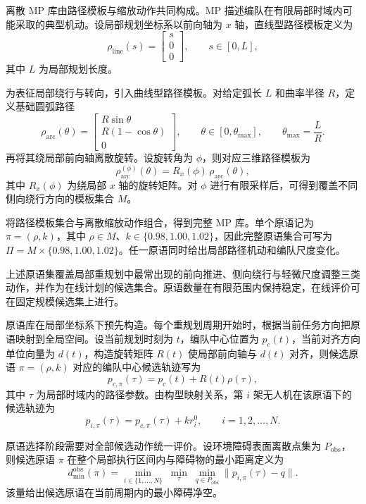 离散 MP 库由路径模板与缩放动作共同构成。MP 描述编队在有限局部时域内可能采取的典型机动。设局部规划坐标系以前向轴为 $x$ 轴，直线型路径模板定义为
\[
\rho_{\mathrm{line}}(s) =
\begin{bmatrix}
s\\0\\0
\end{bmatrix}, \qquad s\in[0,L],
\]
其中 $L$ 为局部规划长度。

为表征局部绕行与转向，引入曲线型路径模板。对给定弧长 $L$ 和曲率半径 $R$，定义基础圆弧路径
\[
\rho_{\mathrm{arc}}(\theta) =
\begin{bmatrix}
R\sin\theta\\
R(1-\cos\theta)\\
0
\end{bmatrix}, \qquad
\theta \in [0,\theta_{\max}], \qquad
\theta_{\max} = \frac{L}{R}.
\]
再将其绕局部前向轴离散旋转。设旋转角为 $\phi$，则对应三维路径模板为
\[
\rho_{\mathrm{arc}}^{(\phi)}(\theta) = R_{x}(\phi) \, \rho_{\mathrm{arc}}(\theta),
\]
其中 $R_{x}(\phi)$ 为绕局部 $x$ 轴的旋转矩阵。对 $\phi$ 进行有限采样后，可得到覆盖不同侧向绕行方向的模板集合 $M$。

将路径模板集合与离散缩放动作组合，得到完整 MP 库。单个原语记为 $\pi = (\rho, k)$，其中 $\rho\in M$、$k\in\{0.98,1.00,1.02\}$，因此完整原语集合可写为 $\Pi = M \times \{0.98,1.00,1.02\}$。任一原语同时给出局部路径机动和编队尺度变化。

上述原语集覆盖局部重规划中最常出现的前向推进、侧向绕行与轻微尺度调整三类动作，并作为在线计划的候选集合。原语数量在有限范围内保持稳定，在线评价可在固定规模候选集上进行。

原语库在局部坐标系下预先构造。每个重规划周期开始时，根据当前任务方向把原语映射到全局空间。设当前规划时刻为 $t$，编队中心位置为 $p_{c}(t)$，当前对齐方向单位向量为 $d(t)$，构造旋转矩阵 $R(t)$ 使局部前向轴与 $d(t)$ 对齐，则候选原语 $\pi=(\rho,k)$ 对应的编队中心候选轨迹写为
\[
p_{c,\pi}(\tau) = p_{c}(t) + R(t)\rho(\tau),
\]
其中 $\tau$ 为局部时域内的路径参数。由构型映射关系，第 $i$ 架无人机在该原语下的候选轨迹为
\[
p_{i,\pi}(\tau) = p_{c,\pi}(\tau) + k r_{i}^{0}, \qquad i=1,2,\ldots,N.
\]

原语选择阶段需要对全部候选动作统一评价。设环境障碍表面离散点集为 $P_{\mathrm{obs}}$，则候选原语 $\pi$ 在整个局部执行区间内与障碍物的最小距离定义为
\[
d_{\min}^{\mathrm{obs}}(\pi) = \min_{i\in\{1,\ldots,N\}}\;\min_{\tau}\;\min_{q\in P_{\mathrm{obs}}} \|p_{i,\pi}(\tau)-q\|.
\]
该量给出候选原语在当前周期内的最小障碍净空。

